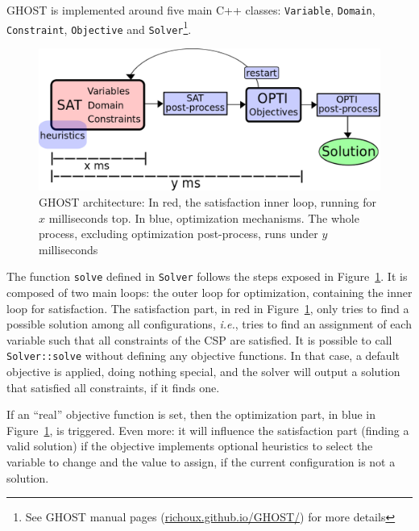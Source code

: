 \documentclass[journal]{IEEEtran}
\newcommand{\csp}{\textsc{CSP}\xspace}
\newcommand{\ghost}{\textsc{GHOST}\xspace}
\newcommand{\ie}{\textit{i.e.}}
\begin{document}
\ghost is implemented around five main C++ classes: \texttt{Variable},
\texttt{Domain},    \texttt{Constraint},     \texttt{Objective}    and
\texttt{Solver}\footnote{See        \ghost         manual        pages
  (\href{http://richoux.github.io/GHOST/}{richoux.github.io/GHOST/})
  for more  details}. %
\begin{figure}[th]
  \centering
  \includegraphics[width=\columnwidth]{figs/archi3.png}
  \caption{\ghost architecture:  In red, the satisfaction  inner loop,
    running  for   $x$  milliseconds   top.   In   blue,  optimization
    mechanisms.    The    whole   process,    excluding   optimization
    post-process, runs under $y$ milliseconds}
  \label{fig:archi}
\end{figure}

The  function \texttt{solve}  defined in  \texttt{Solver} follows  the
steps exposed  in Figure~\ref{fig:archi}. It  is composed of  two main
loops: the outer loop for  optimization, containing the inner loop for
satisfaction.      The     satisfaction     part,    in     red     in
Figure~\ref{fig:archi}, only  tries to find a  possible solution among
all configurations, \ie, tries to  find an assignment of each variable
such that all constraints of the \csp are satisfied. It is possible to
call \texttt{Solver::solve} without  defining any objective functions.
In that case,  a default objective is applied,  doing nothing special,
and the solver will output  a solution that satisfied all constraints,
if it finds one.

If an ``real'' objective function  is set, then the optimization part,
in blue  in Figure~\ref{fig:archi}, is  triggered. Even more:  it will
influence  the satisfaction  part (finding  a valid  solution) if  the
objective  implements optional  heuristics to  select the  variable to
change and the value to assign,  if the current configuration is not a
solution.
\end{document}
